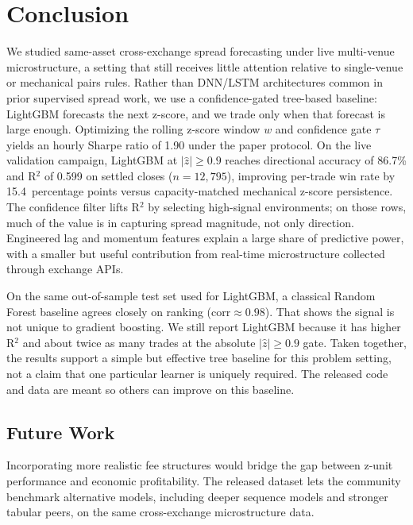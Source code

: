 \section{Conclusion}\label{sec:conclusion}

We studied same-asset cross-exchange spread forecasting under live multi-venue microstructure, a setting that still receives little attention relative to single-venue or mechanical pairs rules. Rather than DNN/LSTM architectures common in prior supervised spread work, we use a confidence-gated tree-based baseline: LightGBM forecasts the next z-score, and we trade only when that forecast is large enough. Optimizing the rolling z-score window $w$ and confidence gate $\tau$ yields an hourly Sharpe ratio of 1.90 under the paper protocol. On the live validation campaign, LightGBM at $|\hat{z}| \geq 0.9$ reaches directional accuracy of 86.7\% and R$^2$ of 0.599 on settled closes ($n{=}12{,}795$), improving per-trade win rate by 15.4~percentage points versus capacity-matched mechanical z-score persistence. The confidence filter lifts R$^2$ by selecting high-signal environments; on those rows, much of the value is in capturing spread magnitude, not only direction. Engineered lag and momentum features explain a large share of predictive power, with a smaller but useful contribution from real-time microstructure collected through exchange APIs.

On the same out-of-sample test set used for LightGBM, a classical Random Forest baseline agrees closely on ranking ($\mathrm{corr}\approx 0.98$). That shows the signal is not unique to gradient boosting. We still report LightGBM because it has higher R$^2$ and about twice as many trades at the absolute $|\hat{z}|\geq 0.9$ gate. Taken together, the results support a simple but effective tree baseline for this problem setting, not a claim that one particular learner is uniquely required. The released code and data are meant so others can improve on this baseline.

\subsection{Future Work}

Incorporating more realistic fee structures would bridge the gap between z-unit performance and economic profitability. The released dataset lets the community benchmark alternative models, including deeper sequence models and stronger tabular peers, on the same cross-exchange microstructure data.
